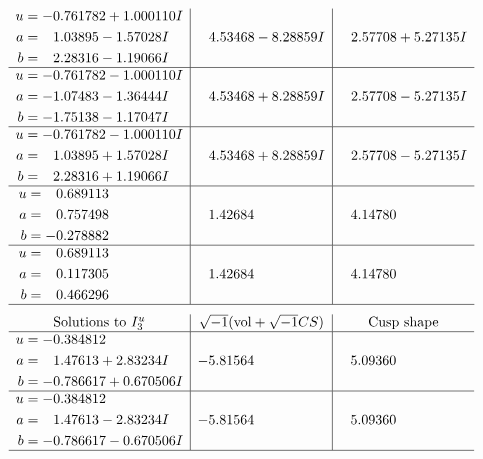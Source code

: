 \documentclass[1p]{elsarticle_modified}
\theoremstyle{definition}
\newcommand{\I}{\sqrt{-1}}
\begin{document}
$$\begin{array}{c|c|c}
\begin{aligned}
u &= -0.761782 + 1.000110 I \\
a &= \phantom{-}1.03895 - 1.57028 I \\
b &= \phantom{-}2.28316 - 1.19066 I\end{aligned}
 & \phantom{-}4.53468 - 8.28859 I & \phantom{-}2.57708 + 5.27135 I \\ \hline\begin{aligned}
u &= -0.761782 - 1.000110 I \\
a &= -1.07483 - 1.36444 I \\
b &= -1.75138 - 1.17047 I\end{aligned}
 & \phantom{-}4.53468 + 8.28859 I & \phantom{-}2.57708 - 5.27135 I \\ \hline\begin{aligned}
u &= -0.761782 - 1.000110 I \\
a &= \phantom{-}1.03895 + 1.57028 I \\
b &= \phantom{-}2.28316 + 1.19066 I\end{aligned}
 & \phantom{-}4.53468 + 8.28859 I & \phantom{-}2.57708 - 5.27135 I \\ \hline\begin{aligned}
u &= \phantom{-}0.689113\phantom{ +0.000000I} \\
a &= \phantom{-}0.757498\phantom{ +0.000000I} \\
b &= -0.278882\phantom{ +0.000000I}\end{aligned}
 & \phantom{-}1.42684\phantom{ +0.000000I} & \phantom{-}4.14780\phantom{ +0.000000I} \\ \hline\begin{aligned}
u &= \phantom{-}0.689113\phantom{ +0.000000I} \\
a &= \phantom{-}0.117305\phantom{ +0.000000I} \\
b &= \phantom{-}0.466296\phantom{ +0.000000I}\end{aligned}
 & \phantom{-}1.42684\phantom{ +0.000000I} & \phantom{-}4.14780\phantom{ +0.000000I}\\
 \hline 
 \end{array}$$\newpage$$\begin{array}{c|c|c}  
\text{Solutions to }I^u_{3}& \I (\text{vol} + \sqrt{-1}CS) & \text{Cusp shape}\\
 \hline 
\begin{aligned}
u &= -0.384812\phantom{ +0.000000I} \\
a &= \phantom{-}1.47613 + 2.83234 I \\
b &= -0.786617 + 0.670506 I\end{aligned}
 & -5.81564\phantom{ +0.000000I} & \phantom{-}5.09360\phantom{ +0.000000I} \\ \hline\begin{aligned}
u &= -0.384812\phantom{ +0.000000I} \\
a &= \phantom{-}1.47613 - 2.83234 I \\
b &= -0.786617 - 0.670506 I\end{aligned}
 & -5.81564\phantom{ +0.000000I} & \phantom{-}5.09360\phantom{ +0.000000I}\\
 \hline 
 \end{array}$$\newpage
\end{document}
